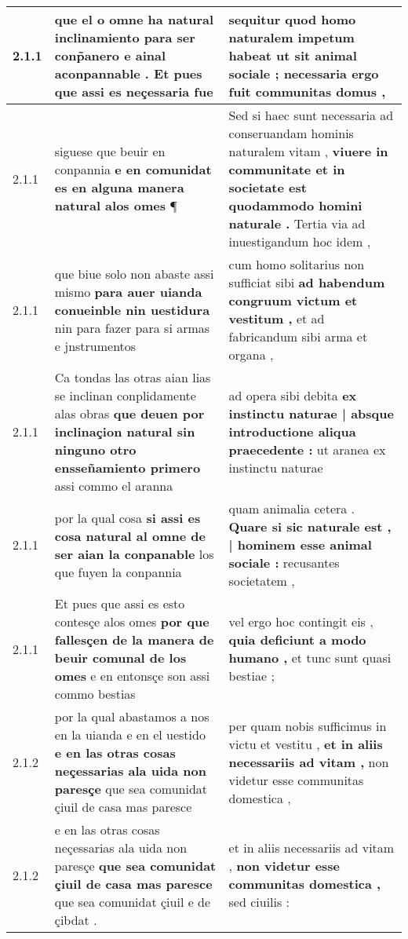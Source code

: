 \begin{tabular}{|p{1cm}|p{6.5cm}|p{6.5cm}|}
2.1.1 & que el o omne ha natural inclinamiento \textbf{ para ser conp̃anero e ainal aconpannable . } Et pues que assi es neçessaria fue & sequitur quod homo naturalem impetum habeat \textbf{ ut sit animal sociale ; } necessaria ergo fuit communitas domus , \\\hline
2.1.1 & siguese que beuir en conpannia \textbf{ e en comunidat es en alguna manera natural alos omes } ¶ & Sed si haec sunt necessaria ad conseruandam hominis naturalem vitam , \textbf{ viuere in communitate et in societate est quodammodo homini naturale . } Tertia via ad inuestigandum hoc idem , \\\hline
2.1.1 & que biue solo non abaste assi mismo \textbf{ para auer uianda conueinble nin uestidura } nin para fazer para si armas e jnstrumentos & cum homo solitarius non sufficiat sibi \textbf{ ad habendum congruum victum et vestitum , } et ad fabricandum sibi arma et organa , \\\hline
2.1.1 & Ca tondas las otras aian lias se inclinan conplidamente alas obras \textbf{ que deuen por inclinaçion natural sin ninguno otro ensseñamiento primero } assi commo el aranna & ad opera sibi debita \textbf{ ex instinctu naturae | absque introductione aliqua praecedente : } ut aranea ex instinctu naturae \\\hline
2.1.1 & por la qual cosa \textbf{ si assi es cosa natural al omne de ser aian la conpanable } los que fuyen la conpannia & quam animalia cetera . \textbf{ Quare si sic naturale est , | hominem esse animal sociale : } recusantes societatem , \\\hline
2.1.1 & Et pues que assi es esto contesçe alos omes \textbf{ por que fallesçen de la manera de beuir comunal de los omes } e en entonsçe son assi commo bestias & vel ergo hoc contingit eis , \textbf{ quia deficiunt a modo humano , } et tunc sunt quasi bestiae ; \\\hline
2.1.2 & por la qual abastamos a nos en la uianda e en el uestido \textbf{ e en las otras cosas neçessarias ala uida non paresçe } que sea comunidat çiuil de casa mas paresce & per quam nobis sufficimus in victu et vestitu , \textbf{ et in aliis necessariis ad vitam , } non videtur esse communitas domestica , \\\hline
2.1.2 & e en las otras cosas neçessarias ala uida non paresçe \textbf{ que sea comunidat çiuil de casa mas paresce } que sea comunidat çiuil e de çibdat . & et in aliis necessariis ad vitam , \textbf{ non videtur esse communitas domestica , } sed ciuilis : \\\hline

\end{tabular}
